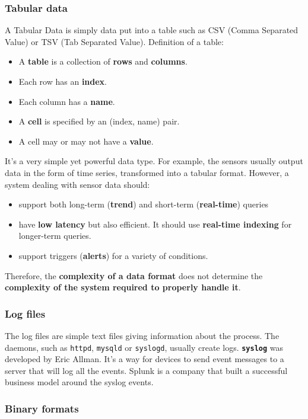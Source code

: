 \subsubsection{Tabular data}

A Tabular Data is simply data put into a table such as CSV (Comma Separated Value) or TSV (Tab Separated Value). Definition of a table:
\begin{itemize}
 \item A {\bf table} is a collection of {\bf rows} and {\bf columns}.
 \item Each row has an {\bf index}.
 \item Each column has a {\bf name}.
 \item A {\bf cell} is specified by an (index, name) pair.
 \item A cell may or may not have a {\bf value}.
\end{itemize}

It's a very simple yet powerful data type. For example, the sensors usually output data in the form of time series, transformed into a tabular format. However, a system dealing with sensor data should:
\begin{itemize}
 \item support both long-term ({\bf trend}) and short-term ({\bf real-time}) queries
 \item have {\bf low latency} but also efficient. It should use {\bf real-time indexing} for longer-term queries.
 \item support triggers ({\bf alerts}) for a variety of conditions.
\end{itemize}
Therefore, the {\bf complexity of a data format} does not determine the {\bf complexity of the system required to properly handle it}.

\subsubsection{Log files}

The log files are simple text files giving information about the process. The daemons, such as \verb+httpd+, \verb+mysqld+ or \verb+syslogd+, usually create logs. {\bf \verb+syslog+} was developed by Eric Allman. It's a way for devices to send event messages to a server that will log all the events. Splunk is a company that built a successful business model around the syslog events.

\subsubsection{Binary formats}

